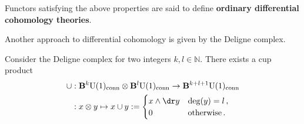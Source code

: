     Functors satisfying the above properties are said to define \textbf{ordinary differential cohomology theories}.

    Another approach to differential cohomology is given by the Deligne complex.

    \begin{property}
        Consider the Deligne complex for two integers $k,l\in\mathbb{N}$. There exists a cup product
        \begin{align}
            \cup&:\mathbf{B}^k\mathrm{U}(1)_{\text{conn}}\otimes\mathbf{B}^l\mathrm{U}(1)_{\text{conn}}\rightarrow\mathbf{B}^{k+l+1}\mathrm{U}(1)_{\text{conn}}\nonumber\\
            &:x\otimes y\mapsto x\cup y:=
            \begin{cases}
                x\wedge\dr y&\deg(y)=l\,,\\
                0&\text{otherwise}\,.
            \end{cases}
        \end{align}
    \end{property}

